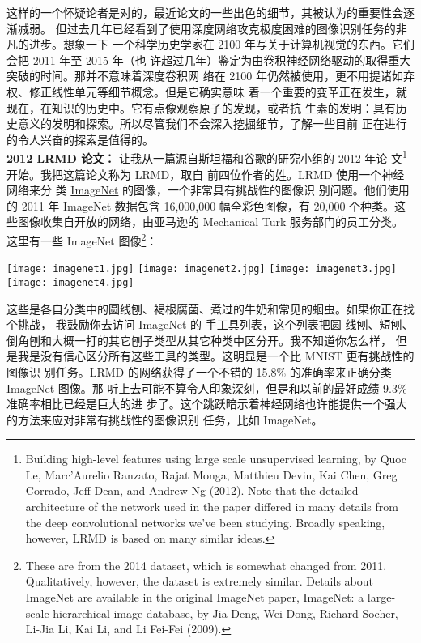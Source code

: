 这样的一个怀疑论者是对的，最近论文的一些出色的细节，其被认为的重要性会逐渐减弱。
但过去几年已经看到了使用深度网络攻克极度困难的图像识别任务的非凡的进步。想象一下
一个科学历史学家在 2100 年写关于计算机视觉的东西。它们会把 2011 年至 2015 年（也
许超过几年）鉴定为由卷积神经网络驱动的取得重大突破的时间。那并不意味着深度卷积网
络在 2100 年仍然被使用，更不用提诸如弃权、修正线性单元等细节概念。但是它确实意味
着一个重要的变革正在发生，就现在，在知识的历史中。它有点像观察原子的发现，或者抗
生素的发明：具有历史意义的发明和探索。所以尽管我们不会深入挖掘细节，了解一些目前
正在进行的令人兴奋的探索是值得的。\\

\textbf{2012 LRMD 论文：} 让我从一篇源自斯坦福和谷歌的研究小组的 2012 年论
文\footnote{Building high-level features using large scale unsupervised
  learning, by Quoc Le, Marc'Aurelio Ranzato, Rajat Monga, Matthieu Devin, Kai
  Chen, Greg Corrado, Jeff Dean, and Andrew Ng (2012). Note that the detailed
  architecture of the network used in the paper differed in many details from
  the deep convolutional networks we've been studying. Broadly speaking,
  however, LRMD is based on many similar ideas.}开始。我把这篇论文称为 LRMD，取自
前四位作者的姓。LRMD 使用一个神经网络来分
类 \href{http://www.image-net.org/}{ImageNet} 的图像，一个非常具有挑战性的图像识
别问题。他们使用的 2011 年 ImageNet 数据包含 16,000,000 幅全彩色图像，有 20,000
个种类。这些图像收集自开放的网络，由亚马逊的 Mechanical Turk 服务部门的员工分类。
这里有一些 ImageNet 图像\footnote{These are from the 2014 dataset, which is
  somewhat changed from 2011. Qualitatively, however, the dataset is extremely
  similar. Details about ImageNet are available in the original ImageNet paper,
  ImageNet: a large-scale hierarchical image database, by Jia Deng, Wei Dong,
  Richard Socher, Li-Jia Li, Kai Li, and Li Fei-Fei (2009).}：

\begin{center}
	\texttt{[image: imagenet1.jpg]}%
	\texttt{[image: imagenet2.jpg]}%
	\texttt{[image: imagenet3.jpg]}%
	\texttt{[image: imagenet4.jpg]}
\end{center}

这些是各自分类中的圆线刨、褐根腐菌、煮过的牛奶和常见的蛔虫。如果你正在找个挑战，
我鼓励你去访问 ImageNet 的%
\href{http://www.image-net.org/synset?wnid=n03489162}{手工具}列表，这个列表把圆
线刨、短刨、倒角刨和大概一打的其它刨子类型从其它种类中区分开。我不知道你怎么样，
但是我是没有信心区分所有这些工具的类型。这明显是一个比 MNIST 更有挑战性的图像识
别任务。LRMD 的网络获得了一个不错的 15.8\% 的准确率来正确分类 ImageNet 图像。那
听上去可能不算令人印象深刻，但是和以前的最好成绩 9.3\% 准确率相比已经是巨大的进
步了。这个跳跃暗示着神经网络也许能提供一个强大的方法来应对非常有挑战性的图像识别
任务，比如 ImageNet。\\

